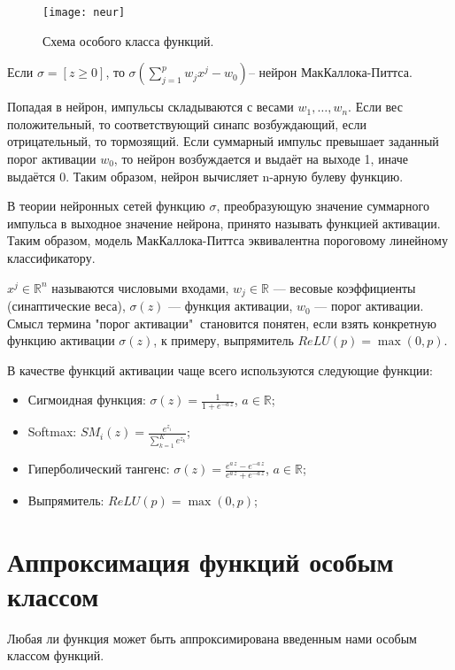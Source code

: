 \documentclass{article}
\begin{document}
	\begin{figure}[H]
		\begin{center}
			\texttt{[image: neur]}
			\caption{Схема особого класса функций.} 
			\label{neur}
		\end{center}
	\end{figure}
	
	Если $\sigma = [z\geq0]$, то $\sigma\left(\sum_{j=1}^{p} w_j x^j - w_0 \right)$-- нейрон МакКаллока-Питтса. 
	
	Попадая в нейрон, импульсы складываются с весами $w_1,\dots,w_n$. Если вес положительный, то соответствующий синапс возбуждающий, если отрицательный, то тормозящий. Если суммарный импульс превышает заданный порог активации $w_0$, то нейрон возбуждается и выдаёт на выходе 1, иначе выдаётся 0. Таким образом, нейрон вычисляет n-арную булеву функцию.
	
	В теории нейронных сетей функцию $\sigma$, преобразующую значение суммарного импульса в выходное значение нейрона, принято называть функцией активации. Таким образом, модель МакКаллока-Питтса эквивалентна пороговому линейному классификатору.
	
	$x^j \in \mathbb{R}^n$ называются числовыми входами, $w_j\in\mathbb{R}$ --- весовые коэффициенты (синаптические веса), $\sigma(z)$ --- функция активации, $w_0$ --- порог активации. Смысл термина "порог активации"$~$ становится понятен, если взять конкретную функцию активации $\sigma(z)$, к примеру, выпрямитель $ReLU(p) = \max (0,p)$.
	
	В качестве функций активации чаще всего используются следующие функции:
	\begin{itemize}
		\item Сигмоидная функция: $\sigma(z) = \frac{1}{1+e^{-a\,z}}$, $a \in \mathbb{R}$;
		
		\item Softmax: $SM_i(z)  = \frac{e^{z_i}}{\sum_{k=1}^{K}e^{z_k}}$;
		\item Гиперболический тангенс: $\sigma(z) = \frac{e^{a\,z} - e^{-a\,z}}{e^{a\,z} + e^{-a\,z}}$, $a \in \mathbb{R}$;
		\item Выпрямитель: $ReLU(p) = \max (0,p)$;
	\end{itemize}
	
	\section{Аппроксимация функций особым классом}
	
	Любая ли функция может быть аппроксимирована введенным нами особым классом функций.
	
\end{document}
